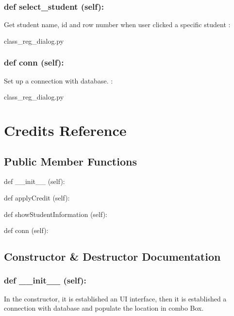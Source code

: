 \hypertarget{class_poly_a14a7ad77ce612b0c54f531d307ee4b39}{
\subsubsection[{def select_student (self):}]{\setlength{\rightskip}{0pt plus 5cm}def {select\_student} (self):}}\label{class_poly_a14a7ad77ce612b0c54f531d307ee4b39}
Get student name, id and row number when user clicked a specific student 
:\begin{DoxyCompactItemize}
\item 
class\_reg\_dialog.\-py\end{DoxyCompactItemize}

\hypertarget{class_poly_a14a7ad77ce612b0c54f531d307ee4b39}{
\subsubsection[{def conn (self):}]{\setlength{\rightskip}{0pt plus 5cm}def {conn} (self):}}\label{class_poly_a14a7ad77ce612b0c54f531d307ee4b39}
Set up a connection with database.
:\begin{DoxyCompactItemize}
\item 
class\_reg\_dialog.\-py\end{DoxyCompactItemize}

\hypertarget{Credits}{\section{Credits Reference}
\label{Credits}
}
\subsection*{Public Member Functions}
\begin{DoxyCompactItemize}
\item 
def {\_\_init\_\_} (self):
\item 
def {applyCredit} (self):
\item 
def {showStudentInformation} (self):
\item 
def {conn} (self):
\end{DoxyCompactItemize}

\subsection{Constructor \& Destructor Documentation}
\hypertarget{class_poly_aa3def076b74bed67904976ad4f9fe9b1}{
\subsubsection[{def __init__ (self):}]{\setlength{\rightskip}{0pt plus 5cm}def {\_\_init\_\_} (self): 
}}
In the constructor, it is established an UI interface, then it is  established a connection with database and populate the location in combo Box.
 

